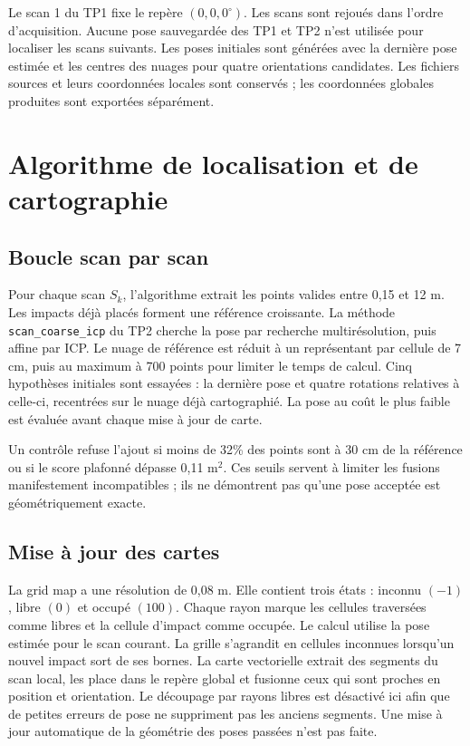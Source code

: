 \documentclass[11pt,a4paper]{article}
\begin{document}
Le scan 1 du TP1 fixe le repère $(0,0,0^\circ)$. Les scans sont rejoués dans
l'ordre d'acquisition. Aucune pose sauvegardée
des TP1 et TP2 n'est utilisée pour localiser les scans suivants. Les poses
initiales sont générées avec la dernière pose estimée et les centres des
nuages pour quatre orientations candidates. Les fichiers sources et leurs coordonnées locales sont
conservés ; les coordonnées globales produites sont exportées séparément.

\section{Algorithme de localisation et de cartographie}
\subsection{Boucle scan par scan}
Pour chaque scan $S_k$, l'algorithme extrait les points valides entre 0,15 et
12 m. Les impacts déjà placés forment une référence croissante. La méthode
\texttt{scan\_coarse\_icp} du TP2 cherche la pose par recherche multirésolution,
puis affine par ICP. Le nuage de référence est réduit à un représentant par
cellule de 7 cm, puis au maximum à 700 points pour limiter le temps de calcul.
Cinq hypothèses initiales sont essayées : la dernière pose et quatre rotations
relatives à celle-ci, recentrées sur le nuage déjà cartographié. La pose au
coût le plus faible est évaluée avant chaque mise à jour de carte.

Un contrôle refuse l'ajout si moins de 32\% des points sont à 30 cm de la
référence ou si le score plafonné dépasse 0,11 m$^2$. Ces seuils servent
à limiter les fusions manifestement incompatibles ; ils ne démontrent pas
qu'une pose acceptée est géométriquement exacte.

\subsection{Mise à jour des cartes}
La grid map a une résolution de 0,08 m. Elle contient trois états : inconnu
$(-1)$, libre $(0)$ et occupé $(100)$. Chaque rayon marque les cellules
traversées comme libres et la cellule d'impact comme occupée. Le calcul utilise
la pose estimée pour le scan courant. La grille s'agrandit en cellules
inconnues lorsqu'un nouvel impact sort de ses bornes. La carte vectorielle extrait des segments
du scan local, les place dans le repère global et fusionne ceux qui sont
proches en position et orientation. Le découpage par rayons libres est désactivé
ici afin que de petites erreurs de pose ne suppriment pas les anciens segments.
Une mise à jour automatique de la géométrie des poses passées n'est pas faite.
\end{document}
